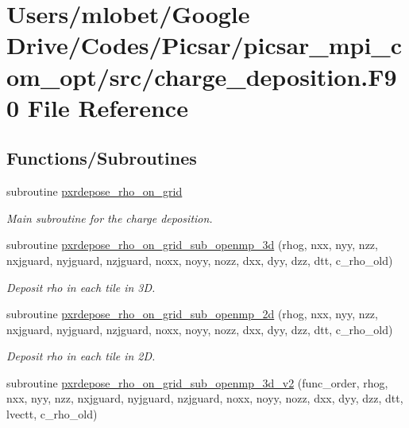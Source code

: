 \hypertarget{charge__deposition_8_f90}{}\section{Users/mlobet/\+Google Drive/\+Codes/\+Picsar/picsar\+\_\+mpi\+\_\+com\+\_\+opt/src/charge\+\_\+deposition.F90 File Reference}
\label{charge__deposition_8_f90}
\subsection*{Functions/\+Subroutines}
\begin{DoxyCompactItemize}
\item 
subroutine \hyperlink{charge__deposition_8_f90_a35ce588d3192033ca711fc1e13ba35b0}{pxrdepose\+\_\+rho\+\_\+on\+\_\+grid}
\begin{DoxyCompactList}\small\item\em Main subroutine for the charge deposition. \end{DoxyCompactList}\item 
subroutine \hyperlink{charge__deposition_8_f90_afa611a1848b404872ce900c3eb0573bc}{pxrdepose\+\_\+rho\+\_\+on\+\_\+grid\+\_\+sub\+\_\+openmp\+\_\+3d} (rhog, nxx, nyy, nzz, nxjguard, nyjguard, nzjguard, noxx, noyy, nozz, dxx, dyy, dzz, dtt, c\+\_\+rho\+\_\+old)
\begin{DoxyCompactList}\small\item\em Deposit rho in each tile in 3D. \end{DoxyCompactList}\item 
subroutine \hyperlink{charge__deposition_8_f90_ab4d6c7838c470fda0e5bbc3ea68b0917}{pxrdepose\+\_\+rho\+\_\+on\+\_\+grid\+\_\+sub\+\_\+openmp\+\_\+2d} (rhog, nxx, nyy, nzz, nxjguard, nyjguard, nzjguard, noxx, noyy, nozz, dxx, dyy, dzz, dtt, c\+\_\+rho\+\_\+old)
\begin{DoxyCompactList}\small\item\em Deposit rho in each tile in 2D. \end{DoxyCompactList}\item 
subroutine \hyperlink{charge__deposition_8_f90_a7e9f7c059faf5920428cdfec1181a9a8}{pxrdepose\+\_\+rho\+\_\+on\+\_\+grid\+\_\+sub\+\_\+openmp\+\_\+3d\+\_\+v2} (func\+\_\+order, rhog, nxx, nyy, nzz, nxjguard, nyjguard, nzjguard, noxx, noyy, nozz, dxx, dyy, dzz, dtt, lvectt, c\+\_\+rho\+\_\+old)

\end{DoxyCompactItemize}
